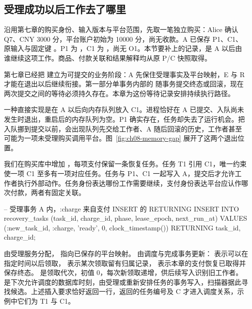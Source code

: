 \subsection*{受理成功以后工作去了哪里}

沿用第七章的购买身份、输入版本与平台范围，先取一笔独立购买：Alice 确认 Q7、CNY 3000 分，平台账户初始为 10000 分，尚无收款。A 已保存 P1、C1、原输入与固定键 。P1 为 ，C1 为 ，尚无 O1。本节要补上的记录，是 A 以后由谁继续这项工作。商品、付款关联和结果解释均从原 P/C 快照取得。

第七章已经把  建立为可提交的业务阶段：A 先保住受理事实及平台映射，E 与 R 才能在退出以后继续衔接。第一部分单事务内部的  随事务提交终态或回滚，现在两次提交之间的等待必须持久存在。本章为这份等待记录安排持续执行路径。

一种直接实现是在 A 以后向内存队列放入 C1。进程恰好在 A 已提交、入队尚未发生时退出，重启后的内存队列为空。P1 确实存在，任务却失去了运行机会。把入队挪到提交以前，会出现队列先交给工作者、A 随后回滚的历史，工作者甚至可能为一项未受理购买调用平台。图~\ref{fig:ch08-memory-gap} 展开了这两个退出位置。


我们在购买库中增加 ，每项支付保留一条恢复任务。任务 T1 引用 C1，唯一约束使一项 C1 至多有一项对应任务。任务与 P1、C1 一起写入 A，提交后才允许工作者执行外部动作。任务身份表达哪份工作需要继续，支付身份表达平台应认作哪次付款，两者有固定关联。

\begin{BookCode}
-- 受理事务 A 内，:charge 来自支付 INSERT 的 RETURNING
INSERT INTO recovery_tasks
  (task_id, charge_id, phase, lease_epoch, next_run_at)
VALUES
  (:new_task_id, :charge, 'ready', 0, clock_timestamp())
RETURNING task_id, charge_id;
\end{BookCode}

 由受理服务分配， 指向已保存的平台映射。 由调度与完成事务更新： 表示可以在指定时间以后领取， 表示某次领取留有归属记录， 表示本章的支付恢复已取得并保存终态。 是领取代次，初值 0，每次新领取递增，供后续写入识别旧工作者。 是下次允许调度的数据库时刻，由受理或重新安排任务的事务写入，扫描器据此寻找候选。上述插入要求恰好返回一行，返回的任务编号及 C 才进入调度关系，示例中它们为 T1 与 C1。

